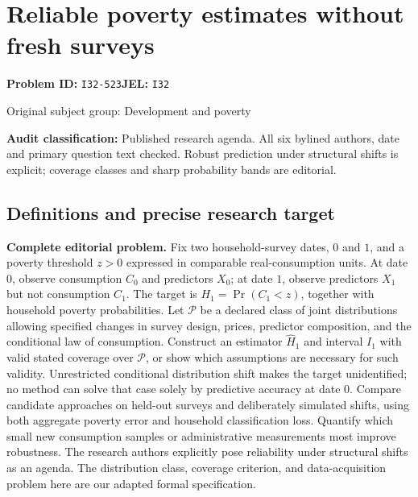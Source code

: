 \documentclass[11pt,a4paper]{article}
\begin{document}
\section*{Reliable poverty estimates without fresh surveys}
\textbf{Problem ID:} \texttt{I32-523}\quad \textbf{JEL:} \texttt{I32}\par
\label{problem:OP-0379}
{\sffamily\small\color{muted}Original subject group: Development and poverty\par}
\label{definitions:problem:30007661}
\textbf{Audit classification:} Published research agenda. All six bylined authors, date and primary question text checked. Robust prediction under structural shifts is explicit; coverage classes and sharp probability bands are editorial.
\subsection*{Definitions and precise research target}
\textbf{Complete editorial problem.} Fix two household-survey dates, \(0\) and \(1\), and a poverty threshold \(z>0\) expressed in comparable real-consumption units. At date \(0\), observe consumption \(C_0\) and predictors \(X_0\); at date \(1\), observe predictors \(X_1\) but not consumption \(C_1\). The target is \(H_1=\Pr(C_1<z)\), together with household poverty probabilities. Let \(\mathcal P\) be a declared class of joint distributions allowing specified changes in survey design, prices, predictor composition, and the conditional law of consumption. Construct an estimator \(\widehat H_1\) and interval \(I_1\) with valid stated coverage over \(\mathcal P\), or show which assumptions are necessary for such validity. Unrestricted conditional distribution shift makes the target unidentified; no method can solve that case solely by predictive accuracy at date \(0\). Compare candidate approaches on held-out surveys and deliberately simulated shifts, using both aggregate poverty error and household classification loss. Quantify which small new consumption samples or administrative measurements most improve robustness. The research authors explicitly pose reliability under structural shifts as an agenda. The distribution class, coverage criterion, and data-acquisition problem here are our adapted formal specification.
\end{document}
